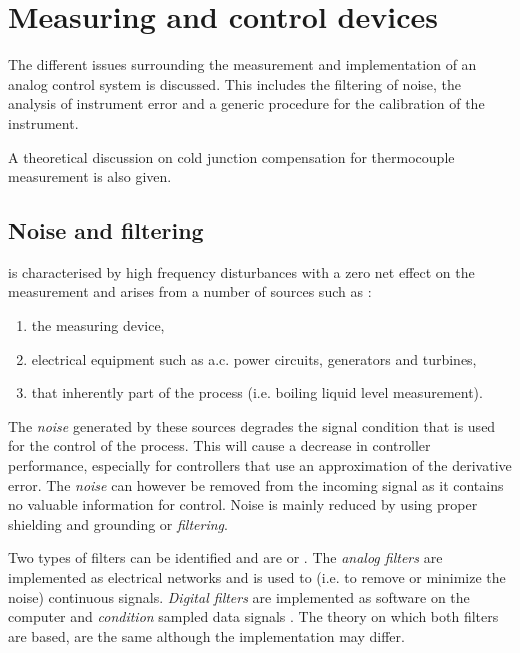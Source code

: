 \chapter{Measuring and control devices}
\begin{overview}
The different issues surrounding the measurement and implementation of an analog control system is discussed. This includes the filtering of noise, the analysis of instrument error and a generic procedure for the calibration of the instrument. 

A theoretical discussion on cold junction compensation  for thermocouple measurement is also given.  
\end{overview}

\section{Noise and filtering}
 is characterised by high frequency disturbances with a zero net effect on the measurement and arises from a number of sources such as \citep[538]{Seborg89}:
\begin{enumerate}
	\item the measuring device,
	\item electrical equipment such as a.c. power circuits, generators and turbines, 
	\item that inherently part of the process (i.e. boiling liquid level measurement).
\end{enumerate}
The \emph{noise} generated by these sources degrades the signal condition that is used for the control of the process. This will cause a decrease in controller performance, especially for controllers that use an approximation of the derivative error. The \emph{noise} can however be removed from the incoming signal as it contains no valuable information \citep[389]{Marlin00} for control. Noise is mainly reduced by using proper shielding and grounding or \emph{filtering}. 

Two types of filters can be identified \citep[539]{Richardson94} and are  or . The \emph{analog filters} are implemented as electrical networks and is used to  (i.e. to remove or minimize the noise) continuous signals. \emph{Digital filters} are implemented as software on the computer and \emph{condition} sampled data signals \citep[539]{Richardson94}. The theory on which both filters are based, are the same although the implementation may differ.

